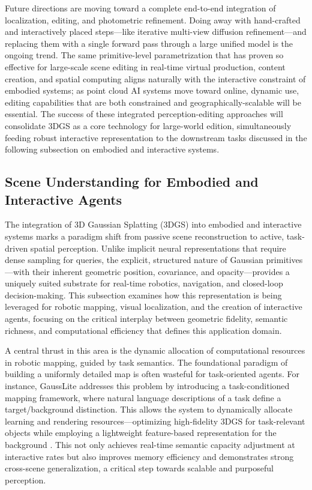 \documentclass[11pt,a4paper]{article}
\begin{document}
Future directions are moving toward a complete end-to-end integration of localization, editing, and photometric refinement. Doing away with hand-crafted and interactively placed steps---like iterative multi-view diffusion refinement---and replacing them with a single forward pass through a large unified model is the ongoing trend. The same primitive-level parametrization that has proven so effective for large-scale scene editing in real-time virtual production, content creation, and spatial computing aligns naturally with the interactive constraint of embodied systems; as point cloud AI systems move toward online, dynamic use, editing capabilities that are both constrained and geographically-scalable will be essential. The success of these integrated perception-editing approaches will consolidate 3DGS as a core technology for large-world edition, simultaneously feeding robust interactive representation to the downstream tasks discussed in the following subsection on embodied and interactive systems.


\subsection{Scene Understanding for Embodied and Interactive Agents}


The integration of 3D Gaussian Splatting (3DGS) into embodied and interactive systems marks a paradigm shift from passive scene reconstruction to active, task-driven spatial perception. Unlike implicit neural representations that require dense sampling for queries, the explicit, structured nature of Gaussian primitives---with their inherent geometric position, covariance, and opacity---provides a uniquely suited substrate for real-time robotics, navigation, and closed-loop decision-making. This subsection examines how this representation is being leveraged for robotic mapping, visual localization, and the creation of interactive agents, focusing on the critical interplay between geometric fidelity, semantic richness, and computational efficiency that defines this application domain.

A central thrust in this area is the dynamic allocation of computational resources in robotic mapping, guided by task semantics. The foundational paradigm of building a uniformly detailed map is often wasteful for task-oriented agents. For instance, GaussLite addresses this problem by introducing a task-conditioned mapping framework, where natural language descriptions of a task define a target/background distinction. This allows the system to dynamically allocate learning and rendering resources---optimizing high-fidelity 3DGS for task-relevant objects while employing a lightweight feature-based representation for the background \cite{arxiv:2406.10788v1}. This not only achieves real-time semantic capacity adjustment at interactive rates but also improves memory efficiency and demonstrates strong cross-scene generalization, a critical step towards scalable and purposeful perception.
\end{document}
